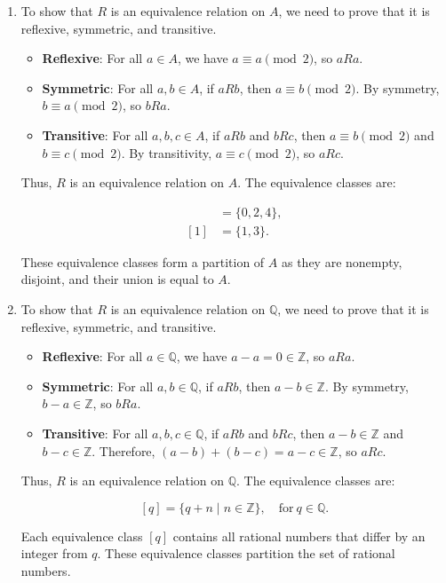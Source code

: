 \begin{enumerate}
\item
To show that $R$ is an equivalence relation on $A$, we need to prove that it is reflexive, symmetric, and transitive.

\begin{itemize}
\item \textbf{Reflexive}: For all $a \in A$, we have $a \equiv a \pmod{2}$, so $aRa$.
\item \textbf{Symmetric}: For all $a, b \in A$, if $aRb$, then $a \equiv b \pmod{2}$. By symmetry, $b \equiv a \pmod{2}$, so $bRa$.
\item \textbf{Transitive}: For all $a, b, c \in A$, if $aRb$ and $bRc$, then $a \equiv b \pmod{2}$ and $b \equiv c \pmod{2}$. By transitivity, $a \equiv c \pmod{2}$, so $aRc$.
\end{itemize}

Thus, $R$ is an equivalence relation on $A$. The equivalence classes are:

\begin{align*}
[0] &= \{0, 2, 4\}, \\
[1] &= \{1, 3\}.
\end{align*}

These equivalence classes form a partition of $A$ as they are nonempty, disjoint, and their union is equal to $A$.

\item
To show that $R$ is an equivalence relation on $\mathbb{Q}$, we need to prove that it is reflexive, symmetric, and transitive.

\begin{itemize}
\item \textbf{Reflexive}: For all $a \in \mathbb{Q}$, we have $a - a = 0 \in \mathbb{Z}$, so $aRa$.
\item \textbf{Symmetric}: For all $a, b \in \mathbb{Q}$, if $aRb$, then $a - b \in \mathbb{Z}$. By symmetry, $b - a \in \mathbb{Z}$, so $bRa$.
\item \textbf{Transitive}: For all $a, b, c \in \mathbb{Q}$, if $aRb$ and $bRc$, then $a - b \in \mathbb{Z}$ and $b - c \in \mathbb{Z}$. Therefore, $(a - b) + (b - c) = a - c \in \mathbb{Z}$, so $aRc$.
\end{itemize}

Thus, $R$ is an equivalence relation on $\mathbb{Q}$. The equivalence classes are:

$$
[q] = \{q + n \mid n \in \mathbb{Z}\}, \quad \text{for}\ q \in \mathbb{Q}.
$$



Each equivalence class $[q]$ contains all rational numbers that differ by an integer from $q$. These equivalence classes partition the set of rational numbers.


\end{enumerate}
